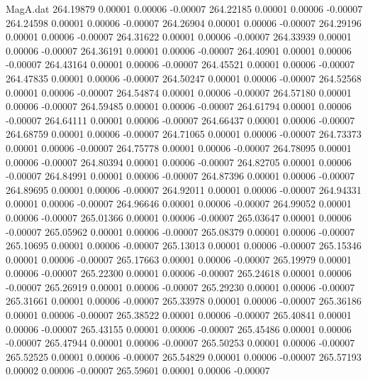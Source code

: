 \begin{filecontents}{MagA.dat}
 264.19879    0.00001    0.00006   -0.00007
 264.22185    0.00001    0.00006   -0.00007
 264.24598    0.00001    0.00006   -0.00007
 264.26904    0.00001    0.00006   -0.00007
 264.29196    0.00001    0.00006   -0.00007
 264.31622    0.00001    0.00006   -0.00007
 264.33939    0.00001    0.00006   -0.00007
 264.36191    0.00001    0.00006   -0.00007
 264.40901    0.00001    0.00006   -0.00007
 264.43164    0.00001    0.00006   -0.00007
 264.45521    0.00001    0.00006   -0.00007
 264.47835    0.00001    0.00006   -0.00007
 264.50247    0.00001    0.00006   -0.00007
 264.52568    0.00001    0.00006   -0.00007
 264.54874    0.00001    0.00006   -0.00007
 264.57180    0.00001    0.00006   -0.00007
 264.59485    0.00001    0.00006   -0.00007
 264.61794    0.00001    0.00006   -0.00007
 264.64111    0.00001    0.00006   -0.00007
 264.66437    0.00001    0.00006   -0.00007
 264.68759    0.00001    0.00006   -0.00007
 264.71065    0.00001    0.00006   -0.00007
 264.73373    0.00001    0.00006   -0.00007
 264.75778    0.00001    0.00006   -0.00007
 264.78095    0.00001    0.00006   -0.00007
 264.80394    0.00001    0.00006   -0.00007
 264.82705    0.00001    0.00006   -0.00007
 264.84991    0.00001    0.00006   -0.00007
 264.87396    0.00001    0.00006   -0.00007
 264.89695    0.00001    0.00006   -0.00007
 264.92011    0.00001    0.00006   -0.00007
 264.94331    0.00001    0.00006   -0.00007
 264.96646    0.00001    0.00006   -0.00007
 264.99052    0.00001    0.00006   -0.00007
 265.01366    0.00001    0.00006   -0.00007
 265.03647    0.00001    0.00006   -0.00007
 265.05962    0.00001    0.00006   -0.00007
 265.08379    0.00001    0.00006   -0.00007
 265.10695    0.00001    0.00006   -0.00007
 265.13013    0.00001    0.00006   -0.00007
 265.15346    0.00001    0.00006   -0.00007
 265.17663    0.00001    0.00006   -0.00007
 265.19979    0.00001    0.00006   -0.00007
 265.22300    0.00001    0.00006   -0.00007
 265.24618    0.00001    0.00006   -0.00007
 265.26919    0.00001    0.00006   -0.00007
 265.29230    0.00001    0.00006   -0.00007
 265.31661    0.00001    0.00006   -0.00007
 265.33978    0.00001    0.00006   -0.00007
 265.36186    0.00001    0.00006   -0.00007
 265.38522    0.00001    0.00006   -0.00007
 265.40841    0.00001    0.00006   -0.00007
 265.43155    0.00001    0.00006   -0.00007
 265.45486    0.00001    0.00006   -0.00007
 265.47944    0.00001    0.00006   -0.00007
 265.50253    0.00001    0.00006   -0.00007
 265.52525    0.00001    0.00006   -0.00007
 265.54829    0.00001    0.00006   -0.00007
 265.57193    0.00002    0.00006   -0.00007
 265.59601    0.00001    0.00006   -0.00007

\end{filecontents}
